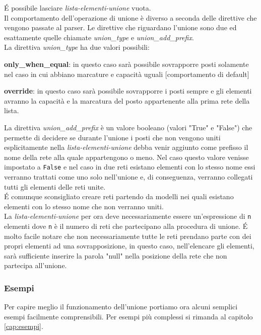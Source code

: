 \documentclass[italian,12pt]{book}
\begin{document}
\'E  possibile lasciare \emph{lista-elementi-unione} vuota. \\
Il comportamento dell'operazione di unione è diverso a seconda delle
direttive che vengono passate al parser. Le direttive che riguardano
l'unione sono due ed esattamente quelle chiamate \emph{union\_type} e
\emph{union\_add\_prefix}.\\
La direttiva \emph{union\_type} ha due valori possibili:
\begin{description}
\item{{\bf only\_when\_equal}}: in questo caso sarà possibile
  sovrapporre posti solamente nel caso in cui abbiano marcature e
  capacità uguali [comportamento di default]
\item{{\bf override}}: in questo caso sarà possibile sovrapporre i
  posti sempre e gli elementi avranno la capacità e la marcatura del
  posto appartenente alla prima rete della lista.
\end{description}
La direttiva \emph{union\_add\_prefix} è un valore booleano (valori
"True" e "False") che permette di decidere se durante l'unione i posti
che non vengono uniti esplicitamente nella
\emph{lista-elementi-unione} debba venir aggiunto come prefisso il
nome della rete alla quale appartengono o meno. Nel caso questo valore
venisse impostato a {\tt False} e nel caso in due reti esistano
elementi con lo stesso nome essi verranno trattati come uno solo
nell'unione e, di conseguenza, verranno collegati tutti gli elementi
delle reti unite.\\
\'E comunque sconsigliato creare reti partendo da modelli nei quali
esistano elementi con lo stesso nome che non verranno uniti.\\
La \emph{lista-elementi-unione} per ora deve necessariamente essere
un'espressione di {\tt n} elementi dove {\tt n} è il numero di reti
che partecipano alla procedura di unione. \'E molto facile notare che
non necessariamente tutte le reti prendano parte con dei propri
elementi ad una sovrapposizione, in questo caso, nell'elencare gli
elementi, sarà sufficiente inserire la parola "null" nella posizione
della rete che non partecipa all'unione.

\subsubsection{Esempi}
Per capire meglio il funzionamento dell'unione portiamo ora alcuni semplici
esempi facilmente comprensibili. Per esempi più complessi si rimanda al capitolo
\ref{cap:esempi}.
\end{document}
